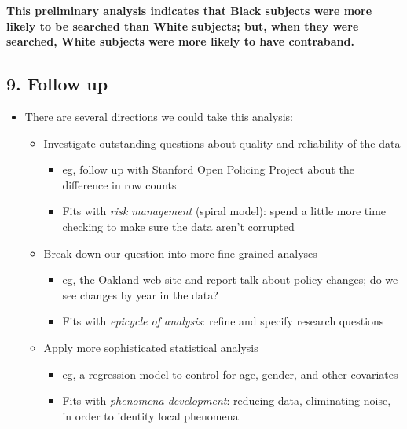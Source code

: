 \documentclass[
]{article}
\providecommand{\tightlist}{%
  \setlength{\itemsep}{0pt}\setlength{\parskip}{0pt}}
\begin{document}
\textbf{This preliminary analysis indicates that Black subjects were more likely to be searched than White subjects; but, when they were searched, White subjects were more likely to have contraband.}

\hypertarget{follow-up}{%
\subsection{9. Follow up}\label{follow-up}}

\begin{itemize}
\tightlist
\item
  There are several directions we could take this analysis:

  \begin{itemize}
  \tightlist
  \item
    Investigate outstanding questions about quality and reliability of the data

    \begin{itemize}
    \tightlist
    \item
      eg, follow up with Stanford Open Policing Project about the difference in row counts
    \item
      Fits with \emph{risk management} (spiral model): spend a little more time checking to make sure the data aren't corrupted
    \end{itemize}
  \item
    Break down our question into more fine-grained analyses

    \begin{itemize}
    \tightlist
    \item
      eg, the Oakland web site and report talk about policy changes; do we see changes by year in the data?
    \item
      Fits with \emph{epicycle of analysis}: refine and specify research questions
    \end{itemize}
  \item
    Apply more sophisticated statistical analysis

    \begin{itemize}
    \tightlist
    \item
      eg, a regression model to control for age, gender, and other covariates
    \item
      Fits with \emph{phenomena development}: reducing data, eliminating noise, in order to identity local phenomena
    \end{itemize}
  \end{itemize}
\end{itemize}
\end{document}
